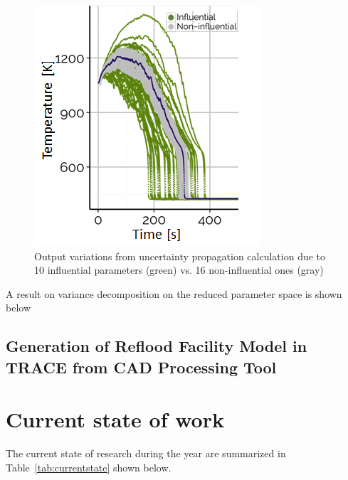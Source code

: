 \documentclass[11pt,titlepage]{article}
\begin{document}
\begin{figure}[h!]
	\centering
	\includegraphics[scale=0.75]{figures/influentialRuns.png}
	\caption{Output variations from uncertainty propagation calculation due to 10 influential parameters (green) vs. 16 non-influential ones (gray)}
	\label{fig:influential}
\end{figure}

A result on variance decomposition on the reduced parameter space is shown below 

\subsection{Generation of Reflood Facility Model in TRACE from CAD Processing Tool} 

\section{Current state of work}

The current state of research during the year are summarized in 
Table~\ref{tab:currentstate} shown below.
\end{document}
